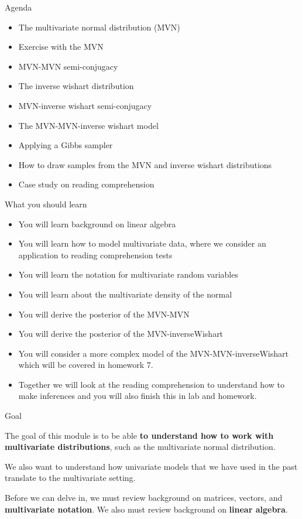 \documentclass[
  ignorenonframetext,
]{beamer}
\providecommand{\tightlist}{%
  \setlength{\itemsep}{0pt}\setlength{\parskip}{0pt}}
\begin{document}
\begin{frame}{Agenda}
\protect\hypertarget{agenda-1}{}

\begin{itemize}
\tightlist
\item
  The multivariate normal distribution (MVN)
\item
  Exercise with the MVN
\item
  MVN-MVN semi-conjugacy
\item
  The inverse wishart distribution
\item
  MVN-inverse wishart semi-conjugacy
\item
  The MVN-MVN-inverse wishart model
\item
  Applying a Gibbs sampler
\item
  How to draw samples from the MVN and inverse wishart distributions
\item
  Case study on reading comprehension
\end{itemize}

\end{frame}

\begin{frame}{What you should learn}
\protect\hypertarget{what-you-should-learn}{}

\begin{itemize}
\tightlist
\item
  You will learn background on linear algebra
\item
  You will learn how to model multivariate data, where we consider an
  application to reading comprehension tests
\item
  You will learn the notation for multivariate random variables
\item
  You will learn about the multivariate density of the normal
\item
  You will derive the posterior of the MVN-MVN
\item
  You will derive the posterior of the MVN-inverseWishart
\item
  You will consider a more complex model of the MVN-MVN-inverseWishart
  which will be covered in homework 7.
\item
  Together we will look at the reading comprehension to understand how
  to make inferences and you will also finish this in lab and homework.
\end{itemize}

\end{frame}

\begin{frame}{Goal}
\protect\hypertarget{goal}{}

The goal of this module is to be able \textbf{to understand how to work
with multivariate distributions}, such as the multivariate normal
distribution.

We also want to understand how univariate models that we have used in
the past translate to the multivariate setting.

Before we can delve in, we must review background on matrices, vectors,
and \textbf{multivariate notation}. We also must review background on
\textbf{linear algebra}.

\end{frame}
\end{document}
